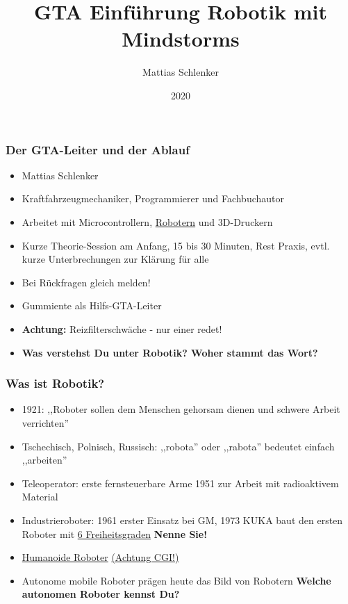 \documentclass{beamer}
\title{GTA Einführung Robotik mit Mindstorms}
\author{Mattias Schlenker}
\institute{Wilhelm-Ostwald-Gymnasium}
\date{2020}
\begin{document}
\frame{\titlepage}

\begin{frame}
\frametitle{Der GTA-Leiter und der Ablauf}
\begin{itemize}
\item Mattias Schlenker
\item Kraftfahrzeugmechaniker, Programmierer und Fachbuchautor 
\item Arbeitet mit Microcontrollern, \href{https://www.youtube.com/watch?v=-ncd1DkRh1M}{Robotern} und 3D-Druckern 
\item Kurze Theorie-Session am Anfang, 15 bis 30 Minuten, Rest Praxis, evtl. kurze Unterbrechungen zur Klärung für alle 
\item Bei Rückfragen gleich melden!
\item Gummiente als Hilfs-GTA-Leiter 
\item \textbf{Achtung:} Reizfilterschwäche - nur einer redet!
\item \textbf{Was verstehst Du unter Robotik? Woher stammt das Wort?}
\end{itemize}
\end{frame}

\begin{frame}
\frametitle{Was ist Robotik?}
\begin{itemize}
\item 1921: ,,Roboter sollen dem Menschen gehorsam dienen und schwere Arbeit verrichten''
\item Tschechisch, Polnisch, Russisch: ,,robota'' oder ,,rabota'' bedeutet einfach ,,arbeiten'' 
\item Teleoperator: erste fernsteuerbare Arme 1951 zur Arbeit mit radioaktivem Material
\item Industrieroboter: 1961 erster Einsatz bei GM, 1973 KUKA baut den ersten Roboter mit \href{https://www.computerbild.de/artikel/cb-Tests-Handy-So-testet-COMPUTER-BILD-Smartphones-25287581.html}{6 Freiheitsgraden} \textbf{Nenne Sie!}
\item \href{https://www.youtube.com/watch?v=_sBBaNYex3E}{Humanoide Roboter} \href{https://youtu.be/dKjCWfuvYxQ?list=PLByDuMFhvvr77bbMhXFQ73Km0BddpccQN}{(Achtung CGI!)}
\item Autonome mobile Roboter prägen heute das Bild von Robotern \textbf{Welche autonomen Roboter kennst Du?}
\end{itemize}
\end{frame}
\end{document}
